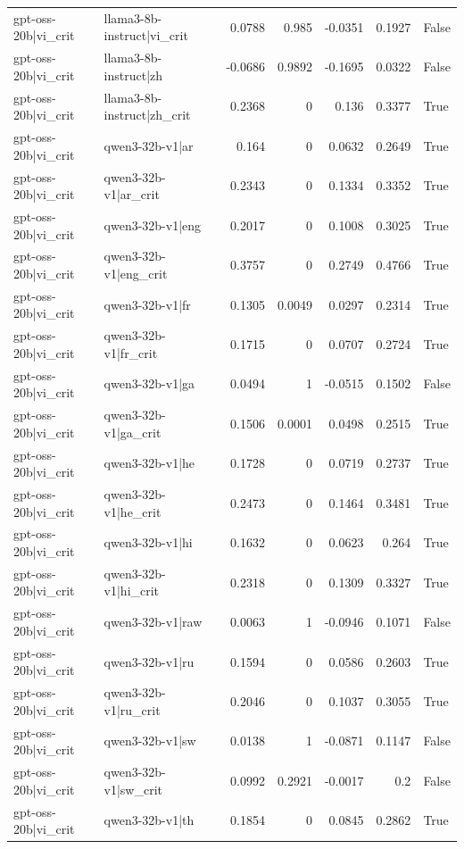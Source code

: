 \begin{table}
\begin{tabular}{l l r r r r l}
gpt-oss-20b|vi_crit & llama3-8b-instruct|vi_crit & 0.0788 & 0.985 & -0.0351 & 0.1927 & False \\
gpt-oss-20b|vi_crit & llama3-8b-instruct|zh & -0.0686 & 0.9892 & -0.1695 & 0.0322 & False \\
gpt-oss-20b|vi_crit & llama3-8b-instruct|zh_crit & 0.2368 & 0 & 0.136 & 0.3377 & True \\
gpt-oss-20b|vi_crit & qwen3-32b-v1|ar & 0.164 & 0 & 0.0632 & 0.2649 & True \\
gpt-oss-20b|vi_crit & qwen3-32b-v1|ar_crit & 0.2343 & 0 & 0.1334 & 0.3352 & True \\
gpt-oss-20b|vi_crit & qwen3-32b-v1|eng & 0.2017 & 0 & 0.1008 & 0.3025 & True \\
gpt-oss-20b|vi_crit & qwen3-32b-v1|eng_crit & 0.3757 & 0 & 0.2749 & 0.4766 & True \\
gpt-oss-20b|vi_crit & qwen3-32b-v1|fr & 0.1305 & 0.0049 & 0.0297 & 0.2314 & True \\
gpt-oss-20b|vi_crit & qwen3-32b-v1|fr_crit & 0.1715 & 0 & 0.0707 & 0.2724 & True \\
gpt-oss-20b|vi_crit & qwen3-32b-v1|ga & 0.0494 & 1 & -0.0515 & 0.1502 & False \\
gpt-oss-20b|vi_crit & qwen3-32b-v1|ga_crit & 0.1506 & 0.0001 & 0.0498 & 0.2515 & True \\
gpt-oss-20b|vi_crit & qwen3-32b-v1|he & 0.1728 & 0 & 0.0719 & 0.2737 & True \\
gpt-oss-20b|vi_crit & qwen3-32b-v1|he_crit & 0.2473 & 0 & 0.1464 & 0.3481 & True \\
gpt-oss-20b|vi_crit & qwen3-32b-v1|hi & 0.1632 & 0 & 0.0623 & 0.264 & True \\
gpt-oss-20b|vi_crit & qwen3-32b-v1|hi_crit & 0.2318 & 0 & 0.1309 & 0.3327 & True \\
gpt-oss-20b|vi_crit & qwen3-32b-v1|raw & 0.0063 & 1 & -0.0946 & 0.1071 & False \\
gpt-oss-20b|vi_crit & qwen3-32b-v1|ru & 0.1594 & 0 & 0.0586 & 0.2603 & True \\
gpt-oss-20b|vi_crit & qwen3-32b-v1|ru_crit & 0.2046 & 0 & 0.1037 & 0.3055 & True \\
gpt-oss-20b|vi_crit & qwen3-32b-v1|sw & 0.0138 & 1 & -0.0871 & 0.1147 & False \\
gpt-oss-20b|vi_crit & qwen3-32b-v1|sw_crit & 0.0992 & 0.2921 & -0.0017 & 0.2 & False \\
gpt-oss-20b|vi_crit & qwen3-32b-v1|th & 0.1854 & 0 & 0.0845 & 0.2862 & True \\

\end{tabular}
\end{table}
